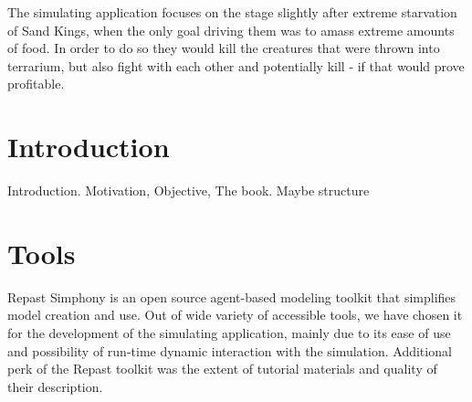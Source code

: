 \documentclass[conference]{IEEEtran}
\begin{document}
The simulating application focuses on the stage slightly after extreme starvation of Sand Kings, when the only goal driving them was to amass extreme amounts of food. In order to do so they would kill the creatures that were thrown into terrarium, but also fight with each other and potentially kill - if that would prove profitable.


\section{Introduction}


\IEEEoverridecommandlockouts{} Introduction. Motivation, Objective, The book. Maybe structure









\section{Tools}

Repast Simphony is an open source agent-based modeling toolkit that simplifies model creation and use. Out of wide variety of accessible tools, we have chosen it for the development of the simulating application, mainly due to its ease of use and possibility of run-time dynamic interaction with the simulation.
Additional perk of the Repast toolkit was the extent of tutorial materials and quality of their description.


\end{document}
